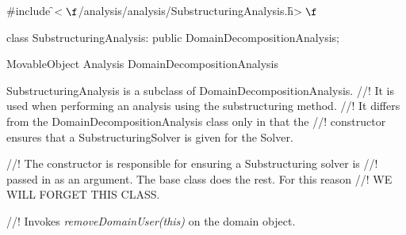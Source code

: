 
\indent \#include \f$<\f$/analysis/analysis/SubstructuringAnalysis.h\f$>\f$

\indent class SubstructuringAnalysis: public DomainDecompositionAnalysis;

\indent MovableObject
\indent Analysis
\indent\indent DomainDecompositionAnalysis
\indent\indent{}

\indent SubstructuringAnalysis is a subclass of DomainDecompositionAnalysis.
//! It is used when performing an analysis using the substructuring method.
//! It differs from the DomainDecompositionAnalysis class only in that the
//! constructor ensures that a SubstructuringSolver is given for the Solver.


//! The constructor is responsible for ensuring a Substructuring solver is
//! passed in as an argument. The base class does the rest. For this reason
//! WE WILL FORGET THIS CLASS.


//! Invokes {\em removeDomainUser(this)} on the domain object.















